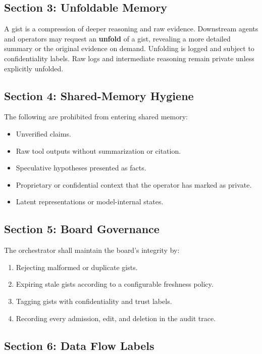 \documentclass[12pt,letterpaper]{article}
\begin{document}
\subsection{Section 3: Unfoldable Memory}

A gist is a compression of deeper reasoning and raw evidence. Downstream agents and operators may request an \textbf{unfold} of a gist, revealing a more detailed summary or the original evidence on demand. Unfolding is logged and subject to confidentiality labels. Raw logs and intermediate reasoning remain private unless explicitly unfolded.

\subsection{Section 4: Shared-Memory Hygiene}

The following are prohibited from entering shared memory:

\begin{itemize}
    \item Unverified claims.
    \item Raw tool outputs without summarization or citation.
    \item Speculative hypotheses presented as facts.
    \item Proprietary or confidential context that the operator has marked as private.
    \item Latent representations or model-internal states.
\end{itemize}

\subsection{Section 5: Board Governance}

The orchestrator shall maintain the board's integrity by:

\begin{enumerate}
    \item Rejecting malformed or duplicate gists.
    \item Expiring stale gists according to a configurable freshness policy.
    \item Tagging gists with confidentiality and trust labels.
    \item Recording every admission, edit, and deletion in the audit trace.
\end{enumerate}

\subsection{Section 6: Data Flow Labels}
\end{document}
